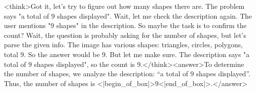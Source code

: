 <think>Got it, let's try to figure out how many shapes there are. The problem says "a total of 9 shapes displayed". Wait, let me check the description again. The user mentions "9 shapes" in the description. So maybe the task is to confirm the count? Wait, the question is probably asking for the number of shapes, but let's parse the given info. The image has various shapes: triangles, circles, polygons, total 9. So the answer would be 9. But let me make sure. The description says "a total of 9 shapes displayed", so the count is 9.</think><answer>To determine the number of shapes, we analyze the description: “a total of 9 shapes displayed”. Thus, the number of shapes is <|begin_of_box|>9<|end_of_box|>.</answer>